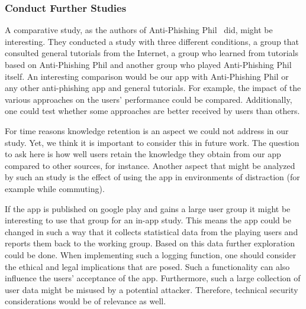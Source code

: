 \subsubsection{Conduct Further Studies}
\begin{description}[leftmargin=0cm]
	\item[Comparative Study:] A comparative study, as the authors of Anti-Phishing Phil~\cite{sheng2007antiphishingphil} did, might be interesting.
	They conducted a study with three different conditions, a group that consulted general tutorials from the Internet, a  group who learned from tutorials based on Anti-Phishing Phil and another group who played Anti-Phishing Phil itself.
	An interesting comparison would be our app with Anti-Phishing Phil or any other anti-phishing app and general tutorials.
For example, the impact of the various approaches on the users' performance could be compared.
Additionally, one could test whether some approaches are better received by users than others.
	\item[Study on Retention:] For time reasons knowledge retention is an aspect we could not address in our study.
	Yet, we think it is important to consider this in future work.
	The question to ask here is how well users retain the knowledge they obtain from our app compared to other sources, for instance.
	Another aspect that might be analyzed by such an study is the effect of using the app in environments of distraction (for example while commuting).
	\item[In-App Statistics:] If the app is published on google play and gains a large user group it might be interesting to use that group for an in-app study. This means the app could be changed in such a way that it collects statistical data from the playing users and reports them back to the working group. Based on this data further exploration could be done. When implementing such a logging function, one should consider the ethical and legal implications that are posed. Such a functionality can also influence the users' acceptance of the app. Furthermore, such a large collection of user data might be misused by a potential attacker. Therefore, technical security considerations would be of relevance as well.
\end{description}

